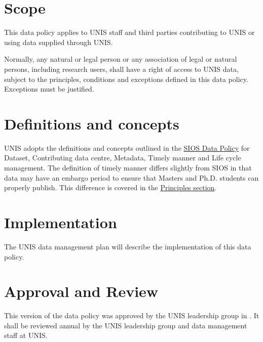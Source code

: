 \documentclass[a4paper,english, 11pt]{article}
\begin{document}
\section{Scope}
\label{s:scope}

This data policy applies to UNIS staff and third parties contributing to UNIS or using data supplied through UNIS.

Normally, any natural or legal person or any association of legal or natural persons, including
research users, shall have a right of access to UNIS data, subject to the
principles, conditions and exceptions defined in this data policy. Exceptions must be justified.

\section{Definitions and concepts}
\label{s:def}

UNIS adopts the definitions and concepts outlined in the \href{https://sios-svalbard.org/sites/sios-svalbard.org/files/common/SIOS_Data_Policy.pdf}{SIOS Data Policy} for Dataset, Contributing data centre, Metadata, Timely manner and Life cycle management. The definition of timely manner differs slightly from SIOS in that data may have an embargo period to ensure that Masters and Ph.D. students can properly publish. This difference is covered in the \hyperref[s:principles]{Principles section}.

\section{Implementation}
\label{s:implementation}

The UNIS data management plan will describe the implementation of this data policy.

\section{Approval and Review}
\label{s:approval}

This version of the data policy was approved by the UNIS leadership group in . It shall be reviewed annual by the UNIS leadership group and data management staff at UNIS.
\end{document}

